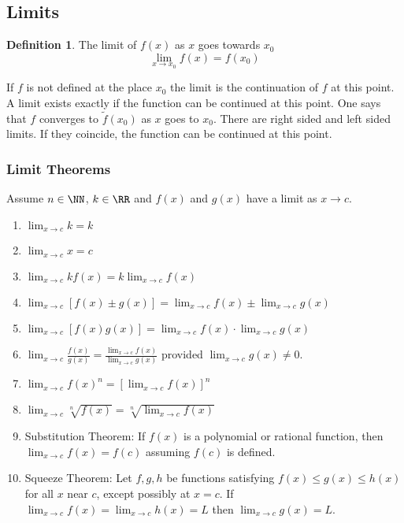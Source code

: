 \documentclass{article}
\theoremstyle{plain}
\theoremstyle{remark}
\theoremstyle{definition}
\newtheorem{defi}[theo]{Definition}
\begin{document}
\subsection*{Limits}

\begin{defi} The limit of $f(x)$ as $x$ goes towards $x_0$
$$\lim_{x\rightarrow x_0}f(x)=f(x_0)$$
\end{defi}
If $f$ is not defined at the place $x_0$ the limit is the continuation of $f$ at this point. A limit exists exactly if the function can be continued at this point. One says that $f$ converges to $\widetilde{f}(x_0)$ as $x$ goes to $x_0$. 
There are right sided and left sided limits. If they coincide, the function can be continued at this point. 

\subsubsection*{Limit Theorems}

Assume $n\in\NN$, $k\in\RR$ and $f(x)$ and $g(x)$ have a limit as $x\rightarrow c$.

\begin{enumerate} \item $\lim_{x\rightarrow c}k=k$
\item $\lim_{x\rightarrow c}x=c$
\item $\lim_{x\rightarrow c}kf(x)=k\lim_{x\rightarrow c}f(x)$
\item $\lim_{x\rightarrow c}[f(x)\pm g(x)]=\lim_{x\rightarrow c}f(x)\pm\lim_{x\rightarrow c}g(x)$
\item $\lim_{x\rightarrow c}[f(x)g(x)]=\lim_{x\rightarrow c}f(x)\cdot\lim_{x\rightarrow c}g(x)$
\item $\lim_{x\rightarrow c}\frac{f(x)}{g(x)}=\frac{\lim_{x\rightarrow c}f(x)}{\lim_{x\rightarrow c}g(x)}$ provided $\lim_{x\rightarrow c}g(x)\neq 0$.
\item $\lim_{x\rightarrow c}f(x)^n = [\lim_{x\rightarrow c}f(x)]^n$
\item $\lim_{x\rightarrow c}\sqrt[n]{f(x)}=\sqrt[n]{\lim_{x\rightarrow c}f(x)}$
\item Substitution Theorem: If $f(x)$ is a polynomial or rational function, then $\lim_{x\rightarrow c}f(x)=f(c)$ assuming $f(c)$ is defined.
\item Squeeze Theorem: Let $f,g,h$ be functions satisfying $f(x)\leqslant g(x)\leqslant h(x)$ for all $x$ near $c$, except possibly at $x=c$. If $\lim_{x\rightarrow c}f(x)=\lim_{x\rightarrow c}h(x)=L$ then $\lim_{x\rightarrow c}g(x)=L$.
\end{enumerate}
\end{document}
